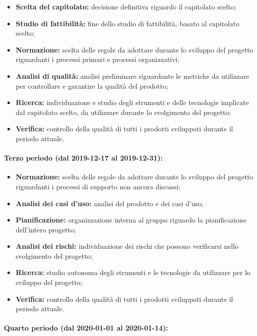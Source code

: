 				\begin{itemize}
					\item \textbf{Scelta del capitolato:} decisione definitiva riguardo il capitolato scelto;
					\item \textbf{Studio di fattibilità:} fine dello studio di fattibilità, basato al capitolato scelto;
					\item \textbf{Normazione:} scelta delle regole da adottare durante lo sviluppo del progetto riguardanti i processi primari e processi organizzativi;
					\item \textbf{Analisi di qualità:} analisi preliminare riguardante le metriche da utilizzare per controllare e garantire la qualità del prodotto;
					\item \textbf{Ricerca:} individuazione e studio degli strumenti e delle tecnologie implicate dal capitolato scelto, da utilizzare durante lo svolgimento del progetto;
					\item \textbf{Verifica:} controllo della qualità di tutti i prodotti sviluppati durante il periodo attuale.
				\end{itemize}
			
			\paragraph{Terzo periodo (dal 2019-12-17 al 2019-12-31):}
			
				\begin{itemize}
					\item \textbf{Normazione:} scelta delle regole da adottare durante lo sviluppo del progetto riguardanti i processi di supporto non ancora discussi;
					\item \textbf{Analisi dei casi d'uso:} analisi del prodotto e dei casi d'uso;
					\item \textbf{Pianificazione:} organizzazione interna al gruppo riguardo la pianificazione dell'intero progetto;
					\item \textbf{Analisi dei rischi:} individuazione dei rischi che possono verificarsi nello svolgimento del progetto;
					\item \textbf{Ricerca:} studio autonoma degli strumenti e le tecnologie da utilizzare per lo sviluppo del progetto;
					\item \textbf{Verifica:} controllo della qualità di tutti i prodotti sviluppati durante il periodo attuale.
				\end{itemize}
			
			\paragraph{Quarto periodo (dal 2020-01-01 al 2020-01-14):}
			
